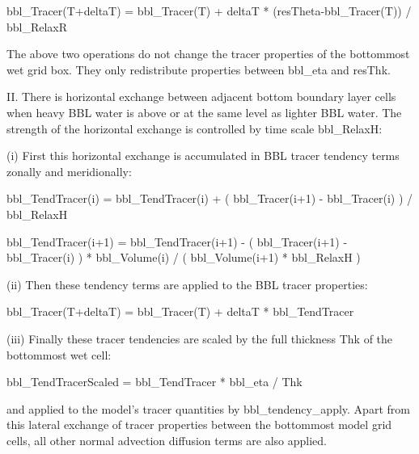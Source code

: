          bbl_Tracer(T+deltaT) = bbl_Tracer(T) +
                                deltaT * (resTheta-bbl_Tracer(T)) / bbl_RelaxR

The above two operations do not change the tracer properties of the bottommost
wet grid box.  They only redistribute properties between bbl_eta and resThk.

II. There is horizontal exchange between adjacent bottom boundary layer cells
when heavy BBL water is above or at the same level as lighter BBL water.  The
strength of the horizontal exchange is controlled by time scale bbl_RelaxH:

(i) First this horizontal exchange is accumulated in BBL tracer tendency terms
zonally and meridionally:

         bbl_TendTracer(i) = bbl_TendTracer(i) +
                             ( bbl_Tracer(i+1) - bbl_Tracer(i) ) /
                             bbl_RelaxH

         bbl_TendTracer(i+1) = bbl_TendTracer(i+1) -
                             ( bbl_Tracer(i+1) - bbl_Tracer(i) ) * bbl_Volume(i) /
                             ( bbl_Volume(i+1) * bbl_RelaxH )

(ii) Then these tendency terms are applied to the BBL tracer properties:

         bbl_Tracer(T+deltaT) = bbl_Tracer(T) + deltaT * bbl_TendTracer

(iii) Finally these tracer tendencies are scaled by the full thickness Thk of
the bottommost wet cell:

         bbl_TendTracerScaled = bbl_TendTracer * bbl_eta / Thk

and applied to the model's tracer quantities by bbl_tendency_apply.  Apart
from this lateral exchange of tracer properties between the bottommost model
grid cells, all other normal advection diffusion terms are also applied.
